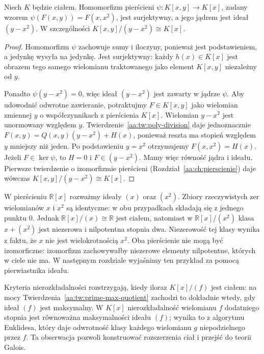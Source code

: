 \begin{twierdzenie}
\label{aa:tw:parabola-quotient}
Niech $K$ będzie ciałem. Homomorfizm pierścieni
$\psi:K[x,y]\to K[x]$, zadany wzorem
$\psi(F(x,y))=F(x,x^2)$, jest surjektywny, a jego
jądrem jest ideał $(y-x^2)$. W szczególności
$K[x,y]/(y-x^2)\cong K[x]$.
\end{twierdzenie}
\begin{proof}
Homomorfizm $\psi$ zachowuje sumy i iloczyny, ponieważ
jest podstawieniem, a jedynkę wysyła na jedynkę.
Jest surjektywny: każdy $h(x)\in K[x]$ jest obrazem
tego samego wielomianu traktowanego jako element
$K[x,y]$ niezależny od $y$.

Ponadto $\psi(y-x^2)=0$, więc ideał $(y-x^2)$ jest
zawarty w jądrze $\psi$. Aby udowodnić odwrotne
zawieranie, potraktujmy $F\in K[x,y]$ jako wielomian
zmiennej $y$ o współczynnikach z pierścienia $K[x]$.
Wielomian $y-x^2$ jest unormowany względem $y$.
Twierdzenie~\ref{aa:tw:poly-division} daje jednoznacznie
$F(x,y)=Q(x,y)(y-x^2)+H(x)$, ponieważ reszta ma
stopień względem $y$ mniejszy niż jeden.
Po podstawieniu $y=x^2$ otrzymujemy
$F(x,x^2)=H(x)$. Jeżeli $F\in\ker\psi$, to $H=0$
i $F\in(y-x^2)$. Mamy więc równość jądra i ideału.
Pierwsze twierdzenie o izomorfizmie pierścieni
(Rozdział~\ref{aa:ch:pierscienie}) daje wówczas
$K[x,y]/(y-x^2)\cong K[x]$.
\end{proof}

\begin{przyklad}
\label{aa:prz:poly-nilpotent-double}
W pierścieniu $\mathbb R[x]$ rozważmy ideały
$(x)$ oraz $(x^2)$. Zbiory rzeczywistych zer wielomianów
$x$ i $x^2$ są identyczne: w obu przypadkach składają
się z jednego punktu $0$. Jednak
$\mathbb R[x]/(x)\cong\mathbb R$ jest ciałem,
natomiast w $\mathbb R[x]/(x^2)$ klasa $x+(x^2)$ jest
niezerowa i nilpotentna stopnia dwa.
Niezerowość tej klasy wynika z faktu, że $x$ nie jest
wielokrotnością $x^2$. Oba pierścienie nie mogą być
izomorficzne: izomorfizm zachowywałby niezerowe elementy
nilpotentne, których w ciele nie ma. W następnym rozdziale
wyjaśnimy ten przykład za pomocą pierwiastnika ideału.
\end{przyklad}

\begin{uwaga}
\label{aa:uw:poly-galois}
Kryteria nierozkładalności rozstrzygają, kiedy iloraz
$K[x]/(f)$ jest ciałem: na mocy
Twierdzenia~\ref{aa:tw:prime-max-quotient} zachodzi to
dokładnie wtedy, gdy ideał $(f)$ jest maksymalny.
W $K[x]$ nierozkładalność wielomianu $f$ dodatniego
stopnia jest równoważna maksymalności ideału $(f)$;
wynika to z algorytmu Euklidesa, który daje
odwrotność klasy każdego wielomianu $g$ niepodzielnego
przez $f$. Ta obserwacja pozwoli konstruować
rozszerzenia ciał i przejść do teorii Galois.
\end{uwaga}
